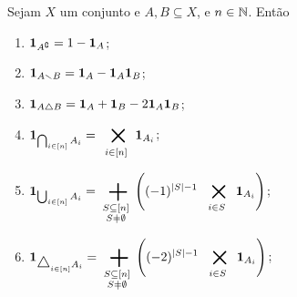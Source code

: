 \begin{proposition}
Sejam $X$ um conjunto e $A,B \subseteq X$, e $n \in \mathbb{N}$. Então
	\begin{enumerate}
	\item ${\bm 1}_{A^\complement} = 1- {\bm 1}_A$;
	\item ${\bm 1}_{A \smallsetminus B} = {\bm 1}_A-{\bm 1}_A{\bm 1}_B$;
	\item ${\bm 1}_{A \mathbin{\triangle} B} = {\bm 1}_A+{\bm 1}_B-2{\bm 1}_A{\bm 1}_B$;
	\item $\displaystyle\idc_{\bigcap_{i \in [n]} A_i} = \bigtimes_{i \in [n]} \idc_{A_i}$;
	\item $\displaystyle\idc_{\bigcup_{i \in [n]} A_i} = \sum_{\substack{S \subseteq [n]\\S \neq \emptyset}} \left((-1)^{\card{S}-1} \bigtimes_{i \in S}\idc_{A_i}\right)$;
	\item $\displaystyle\idc_{\scalebox{1.2}{$\difsim$}_{i \in [n]} A_i} = \sum_{\substack{S \subseteq [n]\\S \neq \emptyset}} \left((-2)^{\card{S}-1} \bigtimes_{i \in S}\idc_{A_i} \right)$;
	\end{enumerate}
\end{proposition}
%	
